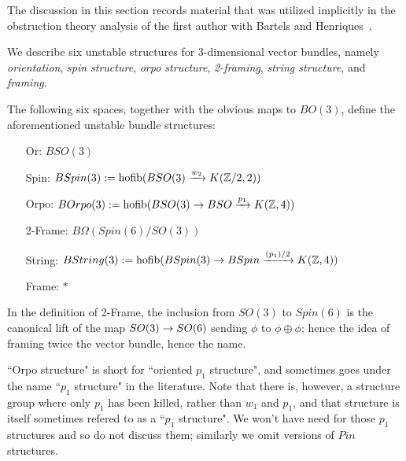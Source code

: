 \documentclass{amsart}
\begin{document}
The discussion in this section records material that was utilized implicitly in the obstruction theory analysis of the first author with Bartels and Henriques~\cite{bdh}.


We describe six unstable structures for 3-dimensional vector bundles, namely \emph{orientation}, \emph{spin structure}, \emph{orpo structure}, \emph{2-framing}, \emph{string structure}, and \emph{framing}.

\begin{definition}
The following six spaces, together with the obvious maps to $BO(3)$, define the aforementioned unstable bundle structures:
\begin{itemize}
\item[Or:] $BSO(3)$
\item[Spin:] $BSpin(3) := \operatorname{hofib}(BSO(3) \xrightarrow{w_2} K(\mathbb Z/2,2))$
\item[Orpo:] $BOrpo(3) := \operatorname{hofib}(BSO(3) \rightarrow BSO \xrightarrow{p_1} K(\mathbb Z,4))$
\item[2-Frame:] $B\Omega(Spin(6)/SO(3))$
\item[String:] $BString(3) := \operatorname{hofib}(BSpin(3) \rightarrow BSpin \xrightarrow{(p_1)/2} K(\mathbb Z,4))$
\item[Frame:] $*$
\end{itemize}
\end{definition}

\nid In the definition of 2-Frame, the inclusion from $SO(3)$ to $Spin(6)$ is the canonical lift of the map $SO(3) \rightarrow SO(6)$ sending $\phi$ to $\phi \oplus \phi$; hence the idea of framing twice the vector bundle, hence the name.

\begin{remark}
``Orpo structure" is short for ``oriented $p_1$ structure", and sometimes goes under the name ``$p_1$ structure" in the literature.  Note that there is, however, a structure group where only $p_1$ has been killed, rather than $w_1$ and $p_1$, and that structure is itself sometimes refered to as a ``$p_1$ structure".  We won't have need for those $p_1$ structures and so do not discuss them; similarly we omit versions of $Pin$ structures.
\end{remark}
\end{document}

